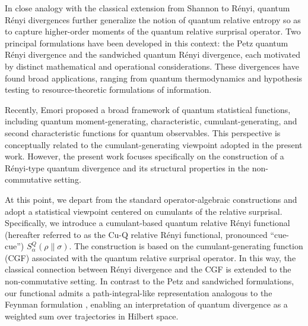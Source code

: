 \documentclass[a4paper, amsfonts, amssymb, amsmath, reprint, showkeys, nofootinbib, twoside, aps, pra]{revtex4-2}
\theoremstyle{definition}
\begin{document}
In close analogy with the classical extension from Shannon to Rényi, quantum Rényi divergences further generalize the notion of quantum relative entropy so as to capture higher-order moments of the quantum relative surprisal operator. Two principal formulations have been developed in this context: the Petz quantum Rényi divergence\cite{Petz1986,Petz1986b} and the sandwiched quantum Rényi divergence\cite{muellerlennert2013,Wilde2014}, each motivated by distinct mathematical and operational considerations. These divergences have found broad applications, ranging from quantum thermodynamics and hypothesis testing to resource-theoretic formulations of information\cite{Wei2018,Guarnieri2019,Hiai2009, Li2024,Datta2009}.


Recently, Emori proposed a broad framework of quantum statistical functions, including quantum moment-generating,
characteristic, cumulant-generating, and second characteristic functions for quantum observables\cite{Emori2026}. This perspective is conceptually related to the cumulant-generating viewpoint adopted in the present work. However, the present work focuses specifically on the construction of a Rényi-type quantum divergence and its structural properties in the non-commutative setting.

At this point, we depart from the standard operator-algebraic constructions and adopt a statistical viewpoint centered on cumulants of the relative surprisal. Specifically, we introduce a cumulant-based quantum relative Rényi functional (hereafter referred to as the Cu-Q relative Rényi functional, pronounced “cue-cue”) $S^Q_\alpha(\rho\|\sigma)$. The construction is based on the cumulant-generating function (CGF) associated with the quantum relative surprisal operator. In this way, the classical connection between Rényi divergence and the CGF is extended to the non-commutative setting. In contrast to the Petz and sandwiched formulations, our functional admits a path-integral-like representation analogous to the Feynman formulation \cite{Feynman1965,Schulman1981}, enabling an interpretation of quantum divergence as a weighted sum over trajectories in Hilbert space.
\end{document}
